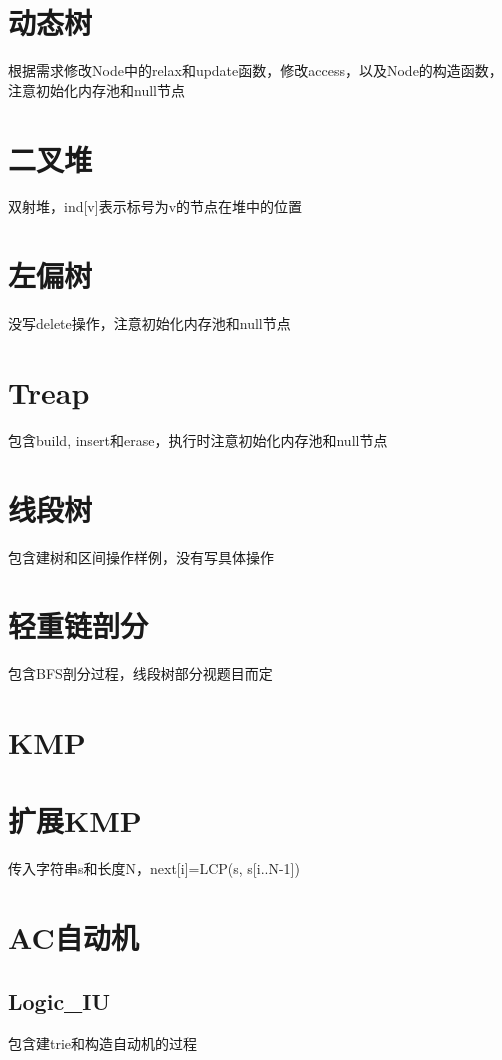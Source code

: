 \documentclass[a4paper,10pt]{book}
\begin{document}
	\section{动态树}
		根据需求修改Node中的relax和update函数，修改access，以及Node的构造函数，注意初始化内存池和null节点
		

	\section{二叉堆}
		双射堆，ind[v]表示标号为v的节点在堆中的位置
		

	\section{左偏树}
		没写delete操作，注意初始化内存池和null节点
		

	\section{Treap}
		包含build, insert和erase，执行时注意初始化内存池和null节点
		

	\section{线段树}
		包含建树和区间操作样例，没有写具体操作
		

	\section{轻重链剖分}
		包含BFS剖分过程，线段树部分视题目而定
		
	
	\section{KMP}
		
	
	\section{扩展KMP}
		传入字符串s和长度N，next[i]=LCP(s, s[i..N-1])
		

	\section{AC自动机}
		\subsection{Logic\_IU}
			包含建trie和构造自动机的过程
			
\end{document}
